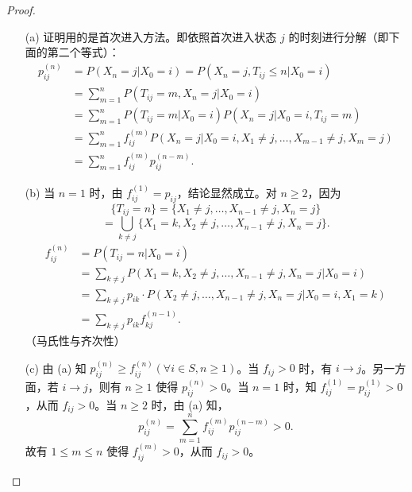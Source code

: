 \documentclass[lang=cn,10pt,thmcnt=section]{elegantbook}
\begin{document}
\begin{proof}
	\begin{enumerate}
		\item[(a)] 证明用的是首次进入方法。即依照首次进入状态 $j$ 的时刻进行分解（即下面的第二个等式）：
		\begin{align*}
		p_{ij}^{(n)} &= P(X_n = j | X_0 = i) = P(X_n = j, T_{ij} \leq n | X_0 = i) \\
		&= \sum_{m=1}^{n} P(T_{ij} = m, X_n = j | X_0 = i) \\
		&= \sum_{m=1}^{n} P(T_{ij} = m | X_0 = i) P(X_n = j | X_0 = i, T_{ij} = m) \\
		&= \sum_{m=1}^{n} f_{ij}^{(m)} P(X_n = j | X_0 = i, X_1 \neq j, \ldots, X_{m-1} \neq j, X_m = j) \\
		&= \sum_{m=1}^{n} f_{ij}^{(m)} p_{ij}^{(n-m)}.
		\end{align*}
		\item[(b)] 当 $n = 1$ 时，由 $f_{ij}^{(1)} = p_{ij}$，结论显然成立。对 $n \geq 2$，因为
		\[
		\{T_{ij} = n\} = \{X_1 \neq j, \ldots, X_{n-1} \neq j, X_n = j\}
		\]
		\[
		= \bigcup_{k \neq j} \{X_1 = k, X_2 \neq j, \ldots, X_{n-1} \neq j, X_n = j\}.
		\]
		\begin{align*}
		f_{ij}^{(n)} &= P(T_{ij} = n | X_0 = i) \\
		&= \sum_{k \neq j} P(X_1 = k, X_2 \neq j, \ldots, X_{n-1} \neq j, X_n = j | X_0 = i) \\
		&= \sum_{k \neq j} p_{ik} \cdot P(X_2 \neq j, \ldots, X_{n-1} \neq j, X_n = j | X_0 = i, X_1 = k) \\
		&= \sum_{k \neq j} p_{ik} f_{kj}^{(n-1)}.
		\end{align*}
		（马氏性与齐次性）
		\item[(c)] 由 (a) 知 $p_{ij}^{(n)} \geq f_{ij}^{(n)} (\forall i \in S, n \geq 1)$。当 $f_{ij} > 0$ 时，有 $i \rightarrow j$。另一方面，若 $i \rightarrow j$，则有 $n \geq 1$ 使得 $p_{ij}^{(n)} > 0$。当 $n = 1$ 时，知 $f_{ij}^{(1)} = p_{ij}^{(1)} > 0$，从而 $f_{ij} > 0$。当 $n \geq 2$ 时，由 (a) 知，
		\[
		p_{ij}^{(n)} = \sum_{m=1}^{n} f_{ij}^{(m)} p_{ij}^{(n-m)} > 0.
		\]
		故有 $1 \leq m \leq n$ 使得 $f_{ij}^{(m)} > 0$，从而 $f_{ij} > 0$。
	\end{enumerate}
\end{proof}
\end{document}

